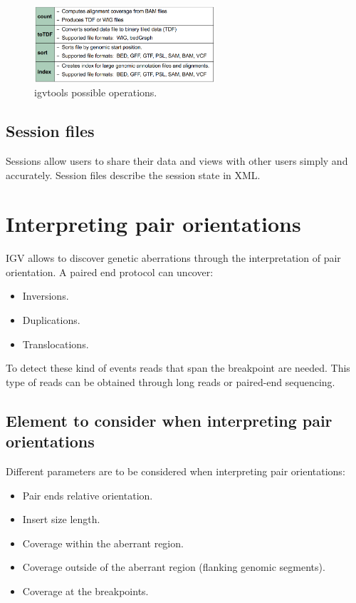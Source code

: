     \begin{figure}[H]
        \centering
        \includegraphics[width=0.6\textwidth]{igvtools.PNG}
        \caption{igvtools possible operations.}
        \label{fig:commands}
    \end{figure}

    \subsection{Session files}
    Sessions allow users to share their data and views with other users simply and accurately.
    Session files describe the session state in XML.

\section{Interpreting pair orientations}
IGV allows to discover  genetic aberrations through the interpretation of pair orientation.
A paired end protocol can uncover:

\begin{multicols}{3}
    \begin{itemize}
        \item Inversions.
        \item Duplications.
        \item Translocations.
    \end{itemize}
\end{multicols}

To detect these kind of events reads that span the breakpoint are needed.
This type of reads can be obtained through long reads or paired-end sequencing.

    \subsection{Element to consider when interpreting pair orientations}
    Different parameters are to be considered when interpreting pair orientations:

    \begin{multicols}{2}
        \begin{itemize}
            \item Pair ends relative orientation.
            \item Insert size length.
            \item Coverage within the aberrant region.
            \item Coverage outside of the aberrant region (flanking genomic segments).
            \item Coverage at the breakpoints.
        \end{itemize}
    \end{multicols}

